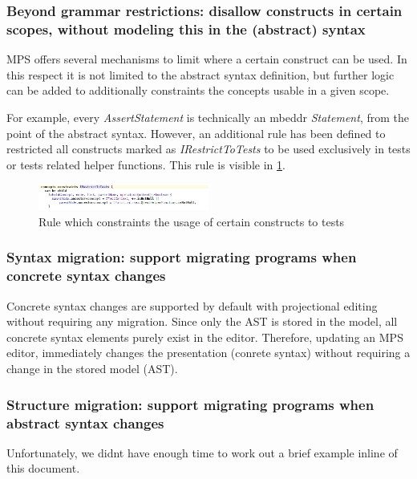 \documentclass[preprint,numbers,10pt]{sigplanconf}
\begin{document}
\subsubsection{Beyond grammar restrictions: disallow constructs in certain scopes, without modeling this in the (abstract) syntax}
\label{evr:beyondgrammar}

MPS offers several mechanisms to limit where a certain construct can be used. In this respect it is not limited to the abstract syntax definition, but further logic can be added to additionally constraints the concepts usable in a given scope.

For example, every \emph{AssertStatement} is technically an mbeddr \emph{Statement}, from the point of the abstract syntax. However, an additional rule has been defined to restricted all constructs marked as \emph{IRestrictToTests} to be used exclusively in tests or tests related helper functions. This rule is visible in \ref{fig:restrictedtotest}.

\begin{figure}[H]
	\centering
	\includegraphics[width=0.50\textwidth]{screens/restricted_to_test.png}
	\caption{Rule which constraints the usage of certain constructs to tests}
	\label{fig:restrictedtotest}
\end{figure}

\subsubsection{Syntax migration: support migrating programs when concrete syntax changes}
\label{evr:synmigr}

Concrete syntax changes are supported by default with projectional editing without requiring any migration. Since only the AST is stored in the model, all concrete syntax elements purely exist in the editor. Therefore, updating an MPS editor, immediately changes the presentation (conrete syntax) without requiring a change in the stored model (AST).

\subsubsection{Structure migration: support migrating programs when abstract syntax changes}
\label{evr:structmigr}
Unfortunately, we didnt have enough time to work out a brief example inline of this document.
\end{document}
